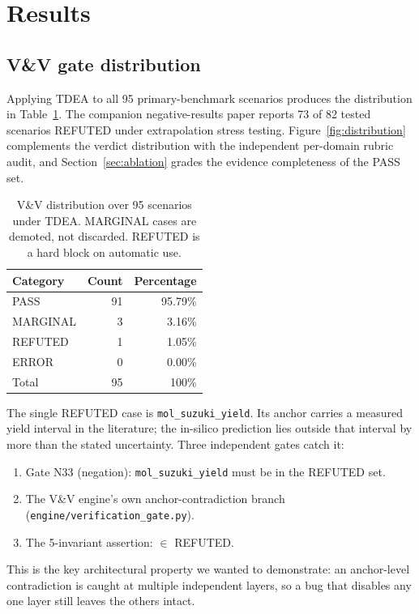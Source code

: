 \documentclass[review,3p]{elsarticle}
\begin{document}
\section{Results}
\label{sec:results}

\subsection{V\&V gate distribution}
\label{sec:results-vv}

Applying TDEA to all 95 primary-benchmark scenarios produces the distribution in Table~\ref{tab:vv}. The companion negative-results paper reports 73 of 82 tested scenarios REFUTED under extrapolation stress testing. Figure~\ref{fig:distribution} complements the verdict distribution with the independent per-domain rubric audit, and Section~\ref{sec:ablation} grades the evidence completeness of the PASS set.

\begin{table}[h]
    \centering
    \caption{V\&V distribution over 95 scenarios under TDEA. MARGINAL cases are demoted, not discarded. REFUTED is a hard block on automatic use.}
    \label{tab:vv}
    \begin{tabular}{lrr}
        \toprule
        Category & Count & Percentage \\
        \midrule
        PASS     & 91 & 95.79\% \\
        MARGINAL & 3  & 3.16\% \\
        REFUTED  & 1  & 1.05\% \\
        ERROR    & 0  & 0.00\% \\
        \midrule
        Total    & 95 & 100\% \\
        \bottomrule
    \end{tabular}
\end{table}

The single REFUTED case is \texttt{mol\_suzuki\_yield}. Its anchor carries a measured yield interval in the literature; the in-silico prediction lies outside that interval by more than the stated uncertainty. Three independent gates catch it:
\begin{enumerate}
    \item Gate N33 (negation): \texttt{mol\_suzuki\_yield} must be in the REFUTED set.
    \item The V\&V engine's own anchor-contradiction branch (\texttt{engine/verification\_gate.py}).
    \item The 5-invariant assertion:  $\in$ REFUTED.
\end{enumerate}
This is the key architectural property we wanted to demonstrate: an anchor-level contradiction is caught at multiple independent layers, so a bug that disables any one layer still leaves the others intact.
\end{document}
